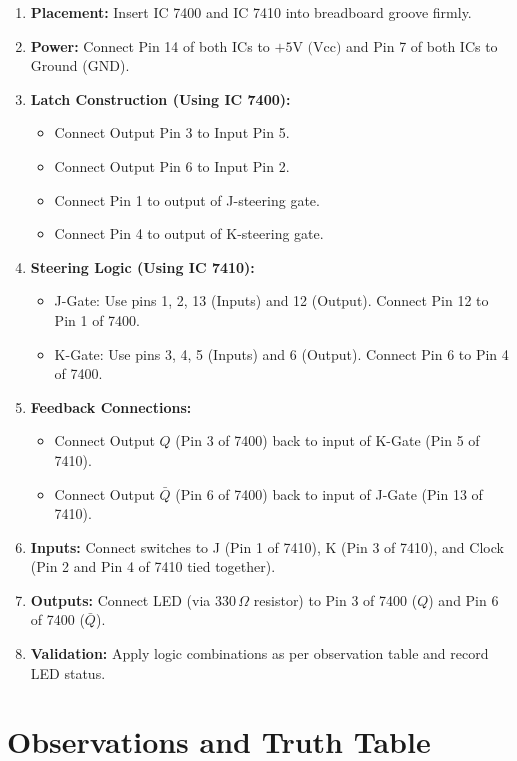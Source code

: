 \begin{enumerate}
    \item \textbf{Placement:} Insert IC 7400 and IC 7410 into breadboard groove firmly.
    \item \textbf{Power:} Connect Pin 14 of both ICs to $+5\text{V (Vcc)}$ and Pin 7 of both ICs to Ground ($\text{GND}$).
    \item \textbf{Latch Construction (Using IC 7400):}
    \begin{itemize}
        \item Connect Output Pin 3 to Input Pin 5.
        \item Connect Output Pin 6 to Input Pin 2.
        \item Connect Pin 1 to output of J-steering gate.
        \item Connect Pin 4 to output of K-steering gate.
    \end{itemize}
    \item \textbf{Steering Logic (Using IC 7410):}
    \begin{itemize}
        \item J-Gate: Use pins 1, 2, 13 (Inputs) and 12 (Output). Connect Pin 12 to Pin 1 of 7400.
        \item K-Gate: Use pins 3, 4, 5 (Inputs) and 6 (Output). Connect Pin 6 to Pin 4 of 7400.
    \end{itemize}
    \item \textbf{Feedback Connections:}
    \begin{itemize}
        \item Connect Output $Q$ (Pin 3 of 7400) back to input of K-Gate (Pin 5 of 7410).
        \item Connect Output $\bar{Q}$ (Pin 6 of 7400) back to input of J-Gate (Pin 13 of 7410).
    \end{itemize}
    \item \textbf{Inputs:} Connect switches to J (Pin 1 of 7410), K (Pin 3 of 7410), and Clock (Pin 2 and Pin 4 of 7410 tied together).
    \item \textbf{Outputs:} Connect LED (via $330\,\Omega$ resistor) to Pin 3 of 7400 ($Q$) and Pin 6 of 7400 ($\bar{Q}$).
    \item \textbf{Validation:} Apply logic combinations as per observation table and record LED status.
\end{enumerate}

\section{Observations and Truth Table}


